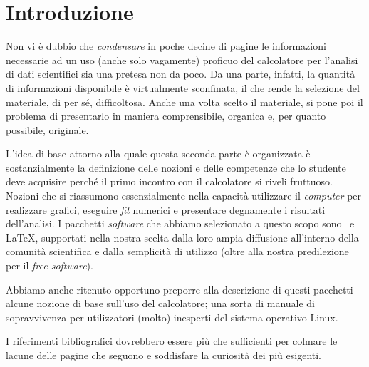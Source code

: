 \thispagestyle{empty}

\chapter*{Introduzione}

Non vi \`e dubbio che \emph{condensare} in poche decine di
pagine le informazioni necessarie ad un uso (anche solo vagamente)
proficuo del calcolatore per l'analisi di dati scientifici sia
una pretesa non da poco.
Da una parte, infatti, la quantit\`a di informazioni disponibile \`e
virtualmente sconfinata, il che rende la selezione del materiale, di per
s\'e, difficoltosa. Anche una volta scelto il materiale, si pone poi il
problema di presentarlo in maniera comprensibile, organica e, per quanto
possibile, originale.

L'idea di base attorno alla quale questa seconda parte \`e organizzata \`e
sostanzialmente la definizione delle nozioni e delle competenze che lo
studente deve acquisire perch\'e il primo incontro con il calcolatore si
riveli fruttuoso. Nozioni che si riassumono
essenzialmente nella capacit\`a utilizzare il \emph{computer} per realizzare
grafici, eseguire \emph{fit} numerici e presentare degnamente i risultati
dell'analisi. I pacchetti \emph{software} che abbiamo selezionato a questo
scopo sono \gnuplot\ e \LaTeX, supportati nella nostra scelta dalla loro ampia
diffusione all'interno della comunit\`a scientifica e dalla semplicit\`a
di utilizzo (oltre alla nostra predilezione per il \emph{free software}).

Abbiamo anche ritenuto opportuno preporre alla descrizione di questi pacchetti
alcune nozione di base sull'uso del calcolatore; una sorta di manuale di
sopravvivenza per utilizzatori (molto) inesperti del sistema operativo Linux.

I riferimenti bibliografici dovrebbero essere pi\`u che sufficienti per colmare
le lacune delle pagine che seguono e soddisfare la curiosit\`a dei pi\`u
esigenti. 

\clearpage
\thispagestyle{plain}
